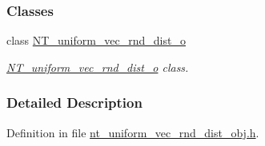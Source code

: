 \subsubsection*{Classes}
\begin{DoxyCompactItemize}
\item 
class \hyperlink{class_n_t__uniform__vec__rnd__dist__o}{NT\_\-uniform\_\-vec\_\-rnd\_\-dist\_\-o}
\begin{DoxyCompactList}\small\item\em \hyperlink{class_n_t__uniform__vec__rnd__dist__o}{NT\_\-uniform\_\-vec\_\-rnd\_\-dist\_\-o} class. \item\end{DoxyCompactList}\end{DoxyCompactItemize}


\subsubsection{Detailed Description}


Definition in file \hyperlink{nt__uniform__vec__rnd__dist__obj_8h_source}{nt\_\-uniform\_\-vec\_\-rnd\_\-dist\_\-obj.h}.

